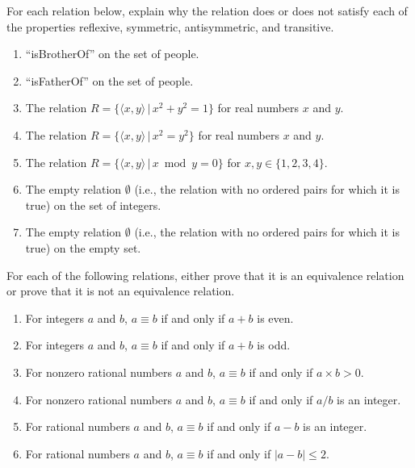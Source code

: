 \begin{exercises}

\item
For each relation below,
explain why the relation does or does not
satisfy each of the properties reflexive, symmetric, antisymmetric,
and transitive.
\begin{enumerate}
\item ``isBrotherOf'' on the set of people.
\item ``isFatherOf'' on the set of people.
\item The relation
\(R = \{\langle x, y\rangle\, |\, x^2 + y^2 = 1\}\)
for real numbers \(x\) and \(y\).
\item The relation
\(R = \{\langle x, y\rangle\, |\, x^2 = y^2\}\)
for real numbers \(x\) and \(y\).
\item The relation
\(R = \{\langle x, y\rangle\, |\, x \bmod y = 0\}\)
for \(x, y \in \{1, 2, 3, 4\}\).
\item The empty relation \(\emptyset\) (i.e., the relation with no
ordered pairs for which it is true) on the set of integers.
\item The empty relation \(\emptyset\) (i.e., the relation with no
ordered pairs for which it is true) on the empty set.
\end{enumerate}

\item
For each of the following relations,
either prove that it is an
equivalence relation or prove that it is not an
equivalence relation.
\begin{enumerate}
\item For integers \(a\) and \(b\), \(a \equiv b\) if and only if
\(a + b\) is even.
\item For integers \(a\) and \(b\), \(a \equiv b\) if and only if
\(a + b\) is odd.
\item For nonzero rational numbers \(a\) and \(b\), \(a \equiv b\)
if and only if \(a \times b > 0\).
\item For nonzero rational numbers \(a\) and \(b\), \(a \equiv b\)
if and only if \(a/b\) is an integer.
\item For rational numbers \(a\) and \(b\), \(a \equiv b\)
if and only if \(a - b\) is an integer.
\item For rational numbers \(a\) and \(b\), \(a \equiv b\)
if and only if \(|a - b| \leq 2\).
\end{enumerate}


\end{exercises}
